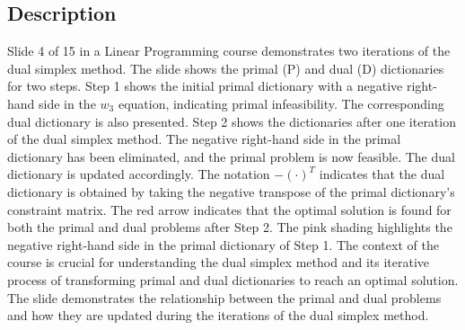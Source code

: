 \documentclass{article}%
\begin{document}
\subsection{Description}%
Slide 4 of 15 in a Linear Programming course demonstrates two iterations of the dual simplex method.  The slide shows the primal (P) and dual (D) dictionaries for two steps. Step 1 shows the initial primal dictionary with a negative right-hand side in the $w_3$ equation, indicating primal infeasibility. The corresponding dual dictionary is also presented.  Step 2 shows the dictionaries after one iteration of the dual simplex method. The negative right-hand side in the primal dictionary has been eliminated, and the primal problem is now feasible. The dual dictionary is updated accordingly. The notation $-(\cdot)^T$ indicates that the dual dictionary is obtained by taking the negative transpose of the primal dictionary's constraint matrix. The red arrow indicates that the optimal solution is found for both the primal and dual problems after Step 2. The pink shading highlights the negative right-hand side in the primal dictionary of Step 1. The context of the course is crucial for understanding the dual simplex method and its iterative process of transforming primal and dual dictionaries to reach an optimal solution. The slide demonstrates the relationship between the primal and dual problems and how they are updated during the iterations of the dual simplex method.%
\end{document}
